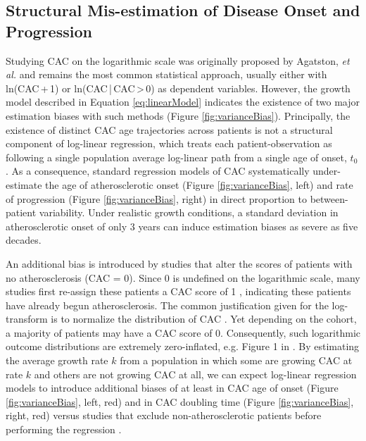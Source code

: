 \documentclass[a4paper, 10pt]{article}
\begin{document}
\subsection{Structural Mis-estimation of Disease Onset and Progression}

Studying CAC on the logarithmic scale was originally proposed by Agatston, \textit{et al.} \cite{agatston1990cac} and remains the most common statistical approach, usually either with ln(CAC\,+\,1) or ln(CAC\,|\,CAC\,>\,0) as dependent variables. However, the growth model described in Equation \ref{eq:linearModel} indicates the existence of two major estimation biases with such methods (Figure \ref{fig:varianceBias}). Principally, the existence of distinct CAC age trajectories across patients is not a structural component of log-linear regression, which treats each patient-observation as following a single population average log-linear path from a single age of onset, $t_0$. As a consequence, standard regression models of CAC systematically under-estimate the age of atherosclerotic onset (Figure \ref{fig:varianceBias}, left) and rate of progression (Figure \ref{fig:varianceBias}, right) in direct proportion to between-patient variability. Under realistic growth conditions, a standard deviation in atherosclerotic onset of only 3 years can induce estimation biases as severe as five decades.

An additional bias is introduced by studies that alter the scores of patients with no atherosclerosis (CAC = 0). Since 0 is undefined on the logarithmic scale, many studies first re-assign these patients a CAC score of 1 \cite{oei2004risk, arad2005events, budoff2006ethnic, schmermund2007comparison, detrano2008predictor, moehlenkamp2011inflammation, wong2011abdominal, leening2012elderly, hughesaustin2016relationship, mcclelland2015prediction, blaha2016improving}, indicating these patients have already begun atherosclerosis. The common justification given for the log-transform is to normalize the distribution of CAC \cite{agatston1990cac, budoff2006ethnic, schmermund2007comparison, folsom2008imt}. Yet depending on the cohort, a majority of patients may have a CAC score of 0. Consequently, such logarithmic outcome distributions are extremely zero-inflated, e.g. Figure 1 in \cite{schmermund2007comparison}. By estimating the average growth rate $k$ from a population in which some are growing CAC at rate $k$ and others are not growing CAC at all, we can expect log-linear regression models to introduce additional biases of at least \biasDiffOnset{} in CAC age of onset (Figure \ref{fig:varianceBias}, left, red) and \biasDiffDoubling{} in CAC doubling time (Figure \ref{fig:varianceBias}, right, red) versus studies that exclude non-atherosclerotic patients before performing the regression \cite{bild2005ethnic, mcclelland2006mesa, bielak2008amish, budoff2013progression, criqui2014density, kaplan2017tsimane}.
\end{document}

